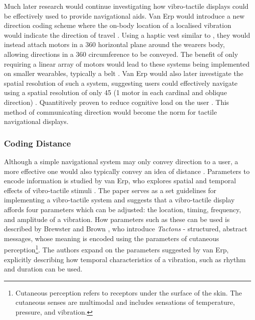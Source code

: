 \documentclass{interim}
\begin{document}
Much later research would continue investigating how vibro-tactile displays could be effectively used to provide navigational aids. Van Erp would introduce a new direction coding scheme where the on-body location of a localised vibration would indicate the direction of travel \cite{van2000tactile}. Using a haptic vest similar to \cite{729547}, they would instead attach motors in a 360\degree{} horizontal plane around the wearers body, allowing directions in a 360\degree{} circumference to be conveyed. The benefit of only requiring a linear array of motors would lead to these systems being implemented on smaller wearables, typically a belt \cite{10.1145/1463160.1463179, tsukada2004activebelt, 10.1145/2449396.2449450}. Van Erp would also later investigate the spatial resolution of such a system, suggesting users could effectively navigate using a spatial resolution of only 45\degree{} (1 motor in each cardinal and oblique direction) \cite{10.1145/1060581.1060585}. Quantitively proven to reduce cognitive load on the user \cite{VANERP2004247}. This method of communicating direction would become the norm for tactile navigational displays.

\subsubsection{Coding Distance}\label{sec:coding-distance}
Although a simple navigational system may only convey direction to a user, a more effective one would also typically convey an idea of distance \cite{burntt2002empirical}. Parameters to encode information is studied by van Erp, who explores spatial and temporal effects of vibro-tactile stimuli \cite{guidelines}. The paper serves as a set guidelines for implementing a vibro-tactile system and suggests that a vibro-tactile display affords four parameters which can be adjusted: the location, timing, frequency, and amplitude of a vibration. How parameters such as these can be used is described by Brewster and Brown \cite{10.5555/976310.976313}, who introduce \textit{Tactons} - structured, abstract messages, whose meaning is encoded using the parameters of cutaneous perception\footnote{Cutaneous perception refers to receptors under the surface of the skin. The cutaneous senses are multimodal and includes sensations of temperature, pressure, and vibration.}. The authors expand on the parameters suggested by van Erp, explicitly describing how temporal characteristics of a vibration, such as rhythm and duration can be used.
\end{document}
